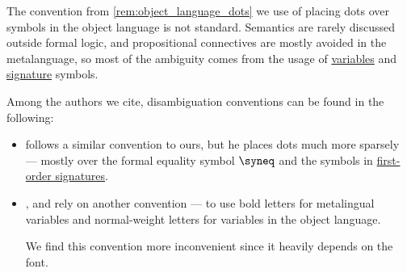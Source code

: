 \begin{remark}\label{rem:object_language_disambiguation_conventions}
  The convention from \cref{rem:object_language_dots} we use of placing dots over symbols in the object language is not standard. Semantics are rarely discussed outside formal logic, and propositional connectives are mostly avoided in the metalanguage, so most of the ambiguity comes from the usage of \hyperref[con:variable]{variables} and \hyperref[con:logical_system_signature]{signature} symbols.

  Among the authors we cite, disambiguation conventions can be found in the following:
  \begin{itemize}
    \item \Textcite[rem. 2.1.3]{Hinman2005Logic} follows a similar convention to ours, but he places dots much more sparsely --- mostly over the formal equality symbol \( {\syneq} \) and the symbols in \hyperref[def:fol_signature]{first-order signatures}.

    \item \Textcite[60]{Church1956LogicVol1}, \textcite*[\S 51]{Andrews2002Logic} and \textcite[8]{Shoenfield1967MathematicalLogic} rely on another convention --- to use bold letters for metalingual variables and normal-weight letters for variables in the object language.

    We find this convention more inconvenient since it heavily depends on the font.
  \end{itemize}
\end{remark}
